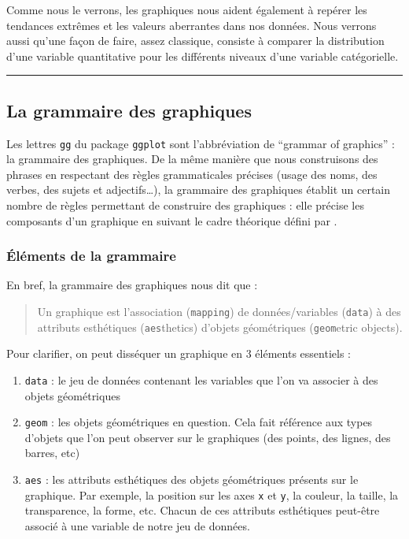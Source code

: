 \documentclass[a4paperpaper,]{article}
\providecommand{\tightlist}{%
  \setlength{\itemsep}{0pt}\setlength{\parskip}{0pt}}
\theoremstyle{definition}
\theoremstyle{definition}
\theoremstyle{definition}
\theoremstyle{remark}
\begin{document}
Comme nous le verrons, les graphiques nous aident également à repérer
les tendances extrêmes et les valeurs aberrantes dans nos données. Nous
verrons aussi qu'une façon de faire, assez classique, consiste à
comparer la distribution d'une variable quantitative pour les différents
niveaux d'une variable catégorielle.

\begin{center}\rule{0.5\linewidth}{\linethickness}\end{center}

\hypertarget{gggraph}{%
\subsection{La grammaire des graphiques}\label{gggraph}}

Les lettres \texttt{gg} du package \texttt{ggplot} sont l'abbréviation
de ``grammar of graphics'' : la grammaire des graphiques. De la même
manière que nous construisons des phrases en respectant des règles
grammaticales précises (usage des noms, des verbes, des sujets et
adjectifs\ldots{}), la grammaire des graphiques établit un certain
nombre de règles permettant de construire des graphiques : elle précise
les composants d'un graphique en suivant le cadre théorique défini par
\citet{wilkinson2005}.

\hypertarget{elements-de-la-grammaire}{%
\subsubsection{Éléments de la
grammaire}\label{elements-de-la-grammaire}}

En bref, la grammaire des graphiques nous dit que :

\begin{quote}
Un graphique est l'association (\texttt{mapping}) de données/variables
(\texttt{data}) à des attributs esthétiques (\texttt{aes}thetics)
d'objets géométriques (\texttt{geom}etric objects).
\end{quote}

Pour clarifier, on peut disséquer un graphique en 3 éléments essentiels
:

\begin{enumerate}
\def\labelenumi{\arabic{enumi}.}
\tightlist
\item
  \texttt{data} : le jeu de données contenant les variables que l'on va
  associer à des objets géométriques
\item
  \texttt{geom} : les objets géométriques en question. Cela fait
  référence aux types d'objets que l'on peut observer sur le graphiques
  (des points, des lignes, des barres, etc)
\item
  \texttt{aes} : les attributs esthétiques des objets géométriques
  présents sur le graphique. Par exemple, la position sur les axes
  \texttt{x} et \texttt{y}, la couleur, la taille, la transparence, la
  forme, etc. Chacun de ces attributs esthétiques peut-être associé à
  une variable de notre jeu de données.
\end{enumerate}
\end{document}
